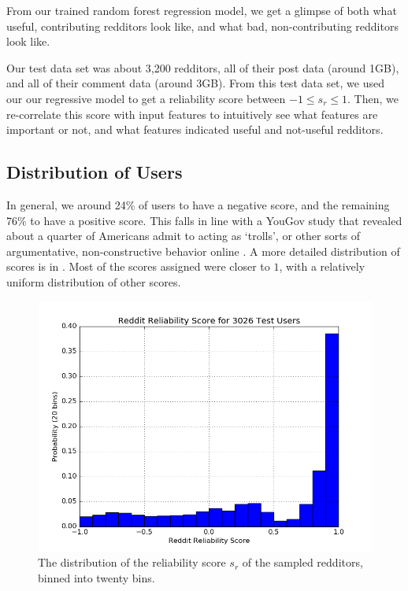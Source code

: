 From our trained random forest regression model, we get a glimpse of both what
useful, contributing redditors look like, and what bad, non-contributing
redditors look like.

Our test data set was about 3,200 redditors, all of their post data (around
1GB), and all of their comment data (around 3GB). From this test data set, we
used our our regressive model to get a reliability score between $-1 \leq s_r
\leq 1$. Then, we re-correlate this score with input features to intuitively see
what features are important or not, and what features indicated useful and
not-useful redditors.

\subsection{Distribution of Users} %
\label{sub:distribution_of_users}

In general, we around 24\% of users to have a negative score, and the remaining
76\% to have a positive score. This falls in line with a YouGov study that
revealed about a quarter of Americans admit to acting as `trolls', or other
sorts of argumentative, non-constructive behavior online \cite{trollstats}. A
more detailed distribution of scores is in . Most of the
scores assigned were closer to $1$, with a relatively uniform distribution of
other scores.

\begin{figure}[tb]
    \centering
    \includegraphics[width=\linewidth]{../src/do_regression/figs/data_20.png}
    \caption{The distribution of the reliability score $s_r$ of the sampled redditors, binned into twenty bins.}
    \label{fig:data_20}
\end{figure}

